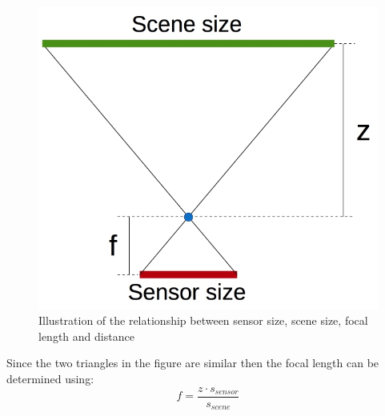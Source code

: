 \begin{figure}[ht!]
  \centering
  \includegraphics[scale=0.375]{figures/scenesize}
  \caption{Illustration of the relationship between sensor size, scene size, focal length and distance}
  \label{fig:scenesize}
\end{figure}
Since the two triangles in the figure are similar then the focal length can be determined using:
\begin{equation}
 f = \frac{z \cdot s_{sensor}}{s_{scene}}
\end{equation}

